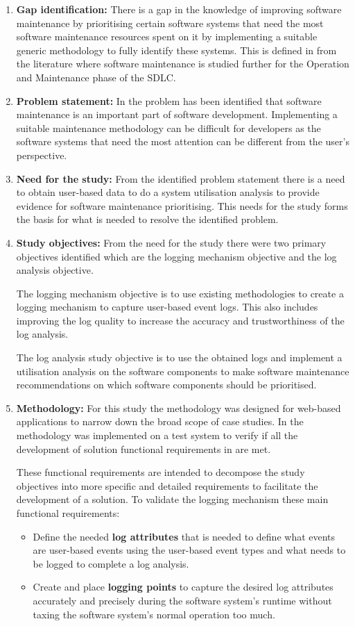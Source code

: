 \begin{enumerate}[label=\textbf{\Roman*.}]	
	\item \textbf{Gap identification:} There is a gap in the knowledge of improving software maintenance by prioritising certain software systems that need the most software maintenance resources spent on it by implementing a suitable generic methodology to fully identify these systems. This is defined in  from the literature where software maintenance is studied further for the Operation and Maintenance phase of the SDLC.
	\item \textbf{Problem statement:} In  the problem has been identified that software maintenance is an important part of software development. Implementing a suitable maintenance methodology can be difficult for developers as the software systems that need the most attention can be different from the user's perspective.  
	\item \textbf{Need for the study:} From the identified problem statement there is a need to obtain user-based data to do a system utilisation analysis to provide evidence for software maintenance prioritising. This needs for the study forms the basis for what is needed to resolve the identified problem.
	\item \textbf{Study objectives:} From the need for the study there were two primary objectives identified which are the logging mechanism objective and the log analysis objective.\par The logging mechanism objective is to use existing methodologies to create a logging mechanism to capture user-based event logs. This also includes improving the log quality to increase the accuracy and trustworthiness of the log analysis.\par The log analysis study objective is to use the obtained logs and implement a utilisation analysis on the software components to make software maintenance recommendations on which software components should be prioritised.
	\item \textbf{Methodology:} For this study the methodology was designed for web-based applications to narrow down the broad scope of case studies. In  the methodology was implemented on a test system to verify if all the development of solution functional requirements in  are met.\par These functional requirements are intended to decompose the study objectives into more specific and detailed requirements to facilitate the development of a solution. To validate the logging mechanism these main functional requirements:
	 \begin{itemize}
		\item Define the needed \textbf{log attributes} that is needed to define what events are user-based events using the user-based event types and what needs to be logged to complete a log analysis.
		\item Create and place \textbf{logging points} to capture the desired log attributes accurately and precisely during the software system's runtime without taxing the software system's normal operation too much.
	 \end{itemize}


\end{enumerate}
